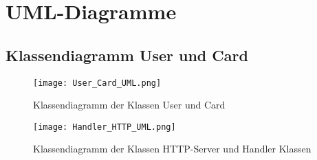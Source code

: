 \documentclass[a4paper, 12pt]{article}
\begin{document}
\pagebreak

\section{UML-Diagramme}
\subsection{Klassendiagramm User und Card}
\begin{figure}[h]
    \centering
    \texttt{[image: User\_Card\_UML.png]}
    \caption{Klassendiagramm der Klassen User und Card}
\end{figure}

\begin{figure} [h]
    \centering
    \texttt{[image: Handler\_HTTP\_UML.png]}
    \caption{Klassendiagramm der Klassen HTTP-Server und Handler Klassen}
\end{figure}
\end{document}
